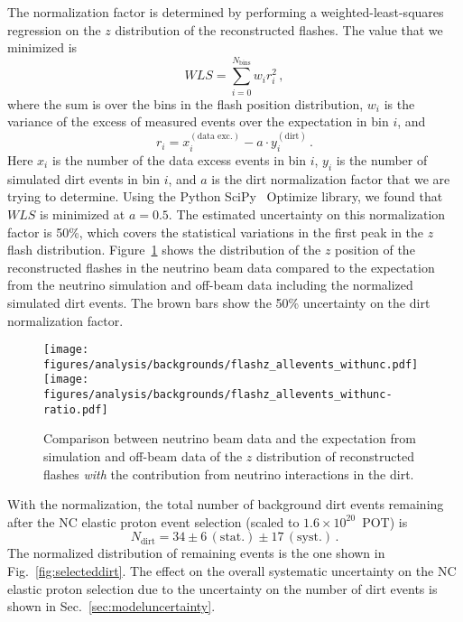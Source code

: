     The normalization factor is determined by performing a
    weighted-least-squares regression on the $z$ distribution of the
    reconstructed flashes. The value that we minimized is
    \begin{equation*}
      WLS = \sum_{i=0}^{N_{\textrm{bins}}} w_i r_i^2 \,,
    \end{equation*}
    where the sum is over the bins in the flash position distribution, $w_i$ is
    the variance of the excess of measured events over the expectation in bin
    $i$, and
    \begin{equation*}
      r_i = x_i^{(\textrm{data exc.})} - a\cdot y_i^{(\textrm{dirt})} \,.
    \end{equation*}
    Here $x_i$ is the number of the data excess events in bin $i$, $y_i$ is the
    number of simulated dirt events in bin $i$, and $a$ is the dirt
    normalization factor that we are trying to determine. Using the Python
    SciPy~\cite{SciPy} Optimize library, we found that $WLS$ is minimized at $a
    = 0.5$. The estimated uncertainty on this normalization factor is 50\%,
    which covers the statistical variations in the first peak in the $z$ flash
    distribution. Figure~\ref{fig:flashwithdirt} shows the distribution of the
    $z$ position of the reconstructed flashes in the neutrino beam data
    compared to the expectation from the neutrino simulation and off-beam data
    including the normalized simulated dirt events. The brown bars show the
    50\% uncertainty on the dirt normalization factor.
    \begin{figure}[ht]
      \centering
      \texttt{[image: figures/analysis/backgrounds/flashz\_allevents\_withunc.pdf]} \\
      \texttt{[image: figures/analysis/backgrounds/flashz\_allevents\_withunc-ratio.pdf]}
      \caption{Comparison between neutrino beam data and the expectation from
      simulation and off-beam data of the $z$ distribution of reconstructed
      flashes \textit{with} the contribution from neutrino interactions in
      the dirt.}
      \label{fig:flashwithdirt}
    \end{figure}

    With the normalization, the total number of background dirt events
    remaining after the NC elastic proton event selection (scaled to $1.6\times
    10^{20}$~POT) is
    \begin{equation*}
     N_{\textrm{dirt}} = 34 \pm 6\, (\textrm{stat.}) \pm 17\, (\textrm{syst.}) \,. 
    \end{equation*}
    The normalized distribution of remaining events is the one shown in
    Fig.~\ref{fig:selecteddirt}. The effect on the overall systematic
    uncertainty on the NC elastic proton selection due to the uncertainty on
    the number of dirt events is shown in Sec.~\ref{sec:modeluncertainty}.

